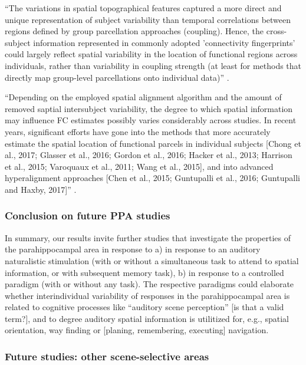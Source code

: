 %
``The variations in spatial topographical features captured a more direct and
unique representation of subject variability than temporal correlations between
regions defined by group parcellation approaches (coupling).
%
Hence, the cross-subject information represented in commonly adopted
'connectivity fingerprints' could largely reflect spatial variability in the
location of functional regions across individuals, rather than variability in
coupling strength (at least for methods that directly map group-level
parcellations onto individual data)'' \citep{bijsterbosch2018relationship}.

%
``Depending on the employed spatial alignment algorithm and the amount of
removed saptial intersubject variability, the degree to which spatial
information may influence FC estimates possibly varies considerably across
studies.
%
In recent years, significant efforts have gone into the methods that more
accurately estimate the spatial location of functional parcels in individual
subjects [Chong et al., 2017; Glasser et al., 2016; Gordon et al., 2016; Hacker
et al., 2013; Harrison et al., 2015; Varoquaux et al., 2011; Wang et al., 2015],
and into advanced hyperalignment approaches [Chen et al., 2015; Guntupalli et
al., 2016; Guntupalli and Haxby, 2017]'' \citep{bijsterbosch2018relationship}.


\subsubsection{Conclusion on future PPA studies}


%
In summary, our results invite further studies that investigate the properties
of the parahippocampal area in response to
%
a) in response to an auditory naturalistic stimulation (with or without a
simultaneous task to attend to spatial information, or with subsequent memory
task),
%
b) in response to a controlled paradigm (with or without any task).
%
The respective paradigms could elaborate whether interindividual variability of
responses in the parahippocampal area is related to cognitive processes like
``auditory scene perception'' [is that a valid term?], and to degree auditory
spatial information is utilitized for, e.g., spatial orientation, way finding or
[planing, remembering, executing] navigation.


\subsubsection{Future studies: other scene-selective areas}

